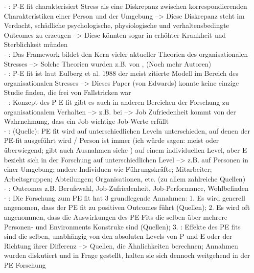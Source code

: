 - \cite[S. 1]{edwards:1990}: P-E fit charakterisiert Stress als eine Diskrepanz zwischen korrespondierenden Charakteristiken einer Person und der Umgebung --> Diese Diskrepanz steht im Verdacht, schädliche psychologische, physiologische und verhaltensbedingte Outcomes zu erzeugen --> Diese könnten sogar in erhöhter Krankheit und Sterblichkeit münden \\
- \cite[S. 1]{edwards:1990}: Das Framework bildet den Kern vieler aktueller Theorien des organisationalen Stresses  --> Solche Theorien wurden z.B. von \textcite{copingAndAdaption:1974}, \textcite{mechanismsOfJobStressAndStrain:1982} (Noch mehr Autoren) \\
- \cite[S. 2]{edwards:1990}: P-E fit ist laut Eulberg et al. 1988 der meist zitierte Modell im Bereich des organisationalen Stresses --> Dieses Paper (von Edwards) konnte keine einzige Studie finden, die frei von Fallstricken war \\
- \cite[S. 3]{edwards:1990}: Konzept des P-E fit gibt es auch in anderen Bereichen der Forschung zu organisationalem Verhalten --> z.B. bei \textcite{locke:1969} --> Job Zufriedenheit kommt von der Wahrnehmung, dass ein Job wichtige Job-Werte erfüllt \\
- \cite[S. 5f.]{edwards:2007}: (Quelle): PE fit wird auf unterschiedlichen Leveln unterschieden, auf denen der PE-fit ausgeführt wird / Person ist immer (ich würde sagen: meist oder überwiegend; gibt auch Ausnahmen siehe \cite[S. 6]{edwards:2007}) auf einem individuellen Level, aber E bezieht sich in der Forschung auf unterschiedlichen Level --> z.B. auf Personen in einer Umgebung; andere Individuen wie Führungskräfte; Mitarbeiter; Arbeitsgruppen; Abteilungen; Organisationen, etc. (zu allem zahlreiche Quellen) \\
- \cite[S. 1]{edwards:2007}: Outcomes z.B. Berufswahl, Job-Zufriedenheit, Job-Performance, Wohlbefinden \\
- \cite[S. 1f.]{edwards:2007}: Die Forschung zum PE fit hat 3 grundlegende Annahmen: 1. Es wird generell angenomen, dass der PE fit zu positiven Outcomes führt (Quellen); 2. Es wird oft angenommen, dass die Auswirkungen des PE-Fits die selben über mehrere Personen- und Environments Konstruke sind (Quellen); 3. \cite[S. 2]{edwards:2007}: Effekte des PE fits sind die selben, unabhängig von den absoluten Levels von P und E oder der Richtung ihrer Differenz --> Quellen, die Ähnlichkeiten berechnen; Annahmen wurden diskutiert und in Frage gestellt, halten sie sich dennoch weitgehend in der PE Forschung \\ 
